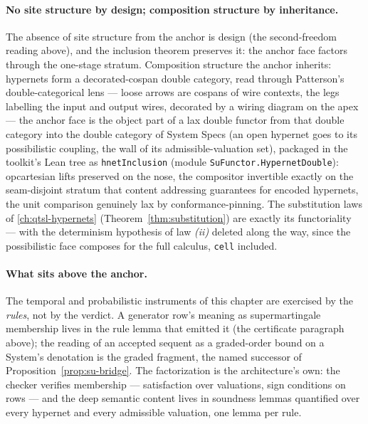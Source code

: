 \paragraph{No site structure by design; composition structure by
inheritance.} The absence of site structure from the anchor is
design (the second-freedom reading above), and the
inclusion theorem preserves it: the anchor face factors
through the one-stage stratum. Composition structure the anchor
inherits: hypernets form a decorated-cospan double category, read
through Patterson's double-categorical lens \cite{patterson23} ---
loose arrows are cospans of wire contexts, the legs labelling the
input and output wires, decorated by a wiring diagram on the apex
--- the anchor face is the object part of a lax double functor
from that double category into the double category of System Specs
(an open hypernet goes to its possibilistic coupling, the wall of
its admissible-valuation set), packaged in the toolkit's Lean tree
as \texttt{hnetInclusion} (module \texttt{SuFunctor.HypernetDouble}):
opcartesian lifts preserved on the nose, the compositor invertible
exactly on the seam-disjoint stratum that content addressing
guarantees for encoded hypernets, the unit comparison genuinely lax
by conformance-pinning. The substitution laws of
\autoref{ch:qtsl-hypernets}
(Theorem~\ref{thm:substitution}) are exactly its functoriality ---
with the determinism hypothesis of law \emph{(ii)} deleted along
the way, since the possibilistic face composes for the full
calculus, \texttt{cell} included.

\paragraph{What sits above the anchor.} The temporal and
probabilistic instruments of this chapter are exercised by the
\emph{rules}, not by the verdict. A generator row's meaning as
supermartingale membership lives in the rule lemma that emitted it
(the certificate paragraph above); the reading of an accepted
sequent as a graded-order bound on a System's denotation is the
graded fragment, the named successor of
Proposition~\ref{prop:su-bridge}. The factorization is the
architecture's own: the checker verifies membership ---
satisfaction over valuations, sign conditions on rows --- and the
deep semantic content lives in soundness lemmas quantified over
every hypernet and every admissible valuation, one lemma per rule.

